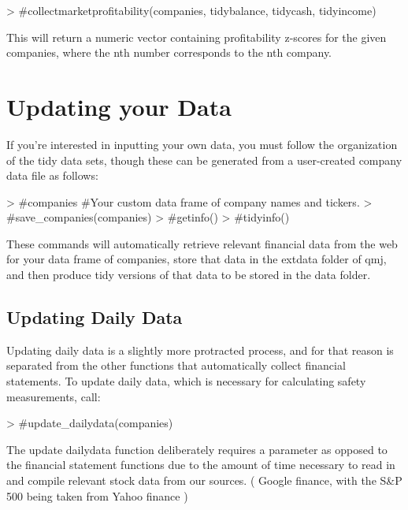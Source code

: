 \documentclass[12pt]{article}
\begin{document}
\begin{Schunk}
\begin{Sinput}
> #collectmarketprofitability(companies, tidybalance, tidycash, tidyincome)
\end{Sinput}
\end{Schunk}

This will return a numeric vector containing profitability z-scores for the given companies, where the nth number corresponds to the nth company. 

\section*{Updating your Data}
If you're interested in inputting your own data, you must follow the organization of the tidy data sets, though these can be generated from a user-created company data file as follows:

\begin{Schunk}
\begin{Sinput}
> #companies #Your custom data frame of company names and tickers.
> #save_companies(companies)
> #getinfo()
> #tidyinfo()
\end{Sinput}
\end{Schunk}

These commands will automatically retrieve relevant financial data from the web for your data frame of companies, store that data in the extdata folder of qmj, and then produce tidy versions of that data to be stored in the data folder.

\subsection*{Updating Daily Data}
Updating daily data is a slightly more protracted process, and for that reason is separated from the other functions that automatically collect financial statements. To update daily data, which is necessary for calculating safety measurements, call:

\begin{Schunk}
\begin{Sinput}
> #update_dailydata(companies)
\end{Sinput}
\end{Schunk}

The update dailydata function deliberately requires a parameter as opposed to the financial statement functions due to the amount of time necessary to read in and compile relevant stock data from our sources. ( Google finance, with the S\&P 500 being taken from Yahoo finance )
\end{document}
